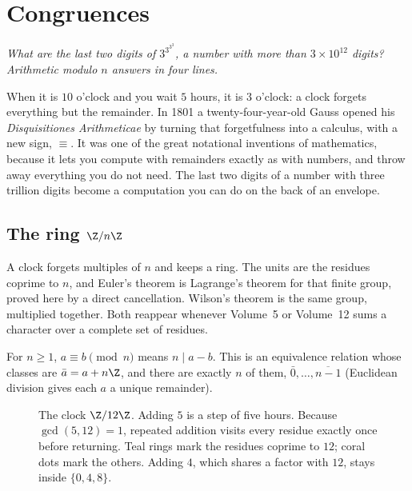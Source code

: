 \chapter{Congruences}\label{ch:congruences}

\begin{center}\itshape
What are the last two digits of $3^{3^{3^3}}$, a number with more than $3\times10^{12}$ digits?\\
Arithmetic modulo $n$ answers in four lines.
\end{center}

When it is $10$ o'clock and you wait $5$ hours, it is $3$ o'clock: a clock forgets everything but the remainder. In 1801 a twenty-four-year-old Gauss
opened his \emph{Disquisitiones Arithmeticae} by turning that forgetfulness into a calculus, with a new sign, $\equiv$. It was one of the great
notational inventions of mathematics, because it lets you compute with remainders exactly as with numbers, and throw away everything you do not need.
The last two digits of a number with three trillion digits become a computation you can do on the back of an envelope.

\section{The ring \texorpdfstring{$\Z/n\Z$}{Z/nZ}}

A clock forgets multiples of $n$ and keeps a ring. The units are the residues coprime to $n$, and Euler's theorem is Lagrange's theorem for that finite group, proved here by a direct cancellation. Wilson's theorem is the same group, multiplied together. Both reappear whenever Volume~5 or Volume~12 sums a character over a complete set of residues.

For $n\ge1$, $a\equiv b\pmod n$ means $n\mid a-b$. This is an equivalence relation whose classes are $\bar a=a+n\Z$, and there are exactly $n$ of them, $\bar0,\dots,\overline{n-1}$ (Euclidean division gives each $a$ a unique remainder).

\begin{figure}[ht]
\centering
{}
\caption{The clock $\Z/12\Z$. Adding $5$ is a step of five hours. Because $\gcd(5,12)=1$, repeated addition visits every residue exactly once before returning. Teal rings mark the residues coprime to $12$; coral dots mark the others. Adding $4$, which shares a factor with $12$, stays inside $\{0,4,8\}$.}
\label{fig:clock}
\end{figure}

